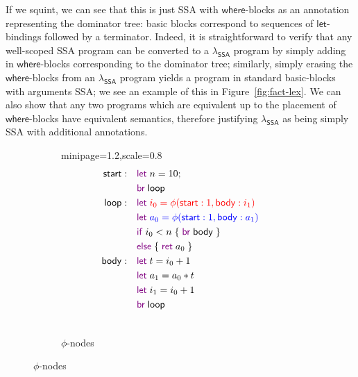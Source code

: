 \documentclass[acmsmall,screen,anonymous,review]{acmart}
\newcommand{\ms}[1]{\ensuremath{\mathsf{#1}}}
\newcommand{\kwms}[1]{\textcolor{violet}{\ms{#1}}}
\newcommand{\lbms}[1]{{\ms{#1}}}
\newcommand{\isotopessa}{\(\lambda_{\ms{SSA}}\)}
\begin{document}
If we squint, we can see that this is just SSA with \ms{where}-blocks as an annotation representing
the dominator tree: basic blocks correspond to sequences of \ms{let}-bindings followed by a
terminator. Indeed, it is straightforward to verify that any well-scoped SSA program can be
converted to a \isotopessa{} program by simply adding in \ms{where}-blocks corresponding to the
dominator tree; similarly, simply erasing the \ms{where}-blocks from an \isotopessa{} program yields
a program in standard basic-blocks with arguments SSA; we see an example of this in
Figure~\ref{fig:fact-lex}. We can also show that any two programs which are equivalent up to the
placement of \ms{where}-blocks have equivalent semantics, therefore justifying \isotopessa{} as
being simply SSA with additional annotations.

\begin{figure}
  \begin{subfigure}[t]{.35\textwidth}
    \centering
    \begin{adjustbox}{minipage=1.2\textwidth,scale=0.8}
    \begin{align*}
      \lbms{start}:\quad  & \kwms{let}\;n = 10; \\
                          & \kwms{br}\;\ms{loop} \\
      \lbms{loop}: \quad  & \begingroup \color{red}
                            \kwms{let}\;i_0 = \phi(\ms{start}: 1, \ms{body}: i_1) 
                          \endgroup \\
                          & \begingroup \color{blue}
                            \kwms{let}\;a_0 = \phi(\ms{start}: 1, \ms{body}: a_1) 
                          \endgroup \\
                          & \kwms{if}\;i_0 < n\;\{\;\kwms{br}\;\lbms{body}\;\} \\
                          & \kwms{else}\;\{\;\kwms{ret}\;a_0\;\} \\
      \lbms{body}: \quad  & \kwms{let}\;t = i_0 + 1 \\
                          & \kwms{let}\;a_1 = a_0 * t \\
                          & \kwms{let}\;i_1 = i_0 + 1 \\
                          & \kwms{br}\;\lbms{loop} \\ \\
    \end{align*}
    \end{adjustbox}
    \caption{$\phi$-nodes}
    \label{fig:fact-phi}
  \end{subfigure}%

\end{figure}
\end{document}
